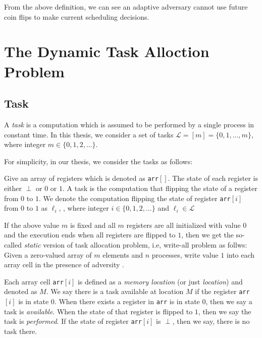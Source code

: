 From the above definition, we can see an adaptive adversary cannot use
future coin flips to make current scheduling decisions.

\section{The Dynamic Task Alloction Problem}

\subsection{Task}

A \emph{task} is a computation which is assumed to be performed by a single process in constant time\cite{georgiou2007all}.
In this thesis, we consider a set of tasks $\mathcal{L} = [m] = \{0, 1, ..., m\}$, where integer $m \in \{0, 1, 2, ...\}$.

For simplicity, in our thesis, we consider the tasks as follows:

Give an array of registers which is denoted as \texttt{arr}$[]$. The state of each register is either $\perp$ or $0$ or $1$.
A task is the computation that flipping the state of a register from $0$ to $1$. We denote the computation
flipping the state of register \texttt{arr}$[i]$ from $0$ to $1$
as $\ell_i$, , where integer $i \in \{0, 1, 2, ...\}$ and $\ell_i \in \mathcal{L}$

If the above value $m$ is fixed and all $m$ registers are all initialized with value $0$ and the execution ends
when all registers are flipped to $1$, then we get the so-called \emph{static} version of task allocation problem,
i.e, write-all problem as follws: Given a zero-valued array of $m$ elements and $n$ processes,
write value $1$ into each array cell in the presence of adversity \cite{kanellakis1992efficient}.

Each array cell \texttt{arr}$[i]$ is defined as a \emph{memory location} (or just \emph{location}) and denoted as $M$.
We say there is a task available at location $M$ if the register \texttt{arr}$[i]$ is in state $0$.
When there exists a register in \texttt{arr} is in state $0$, then we say a task is \emph{available}.
When the state of that register is flipped to $1$, then we say the task is \emph{performed}.
If the state of register \texttt{arr}$[i]$ is $\perp$, then we say, there is no task there.

